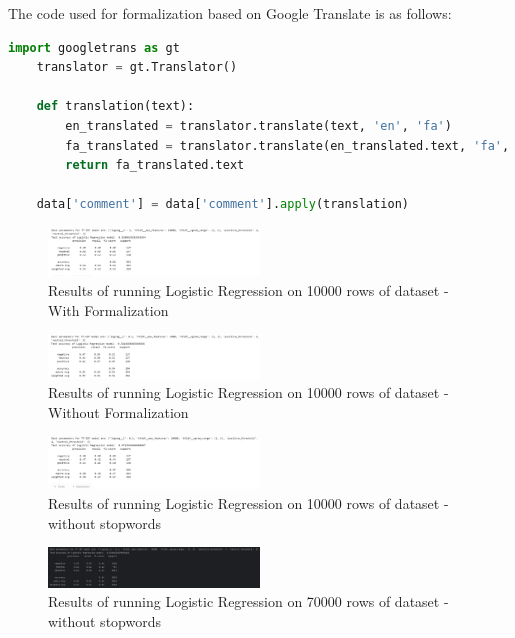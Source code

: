\documentclass{solutionclass} %
\begin{document}
The code used for formalization based on Google Translate is as follows:

\begin{lstlisting}[language=Python]
    import googletrans as gt
    translator = gt.Translator()
    
    def translation(text):
        en_translated = translator.translate(text, 'en', 'fa')
        fa_translated = translator.translate(en_translated.text, 'fa', 'en')
        return fa_translated.text
    
    data['comment'] = data['comment'].apply(translation)
\end{lstlisting}



\begin{figure}[h!]
    \caption{Results of running Logistic Regression on 10000 rows of dataset - With Formalization}
    \centering
    \includegraphics[width=0.5\textwidth]{img/10k_Form.png}
\end{figure}


\begin{figure}[h!]
    \caption{Results of running Logistic Regression on 10000 rows of dataset - Without Formalization}
    \centering
    \includegraphics[width=0.5\textwidth]{img/10k_NoForm.png}
\end{figure}



\begin{figure}[h!]
    \caption{Results of running Logistic Regression on 10000 rows of dataset - without stopwords}
    \centering
    \includegraphics[width=0.5\textwidth]{img/10k_NoSW.png}
\end{figure}


\begin{figure}[h!]
    \caption{Results of running Logistic Regression on 70000 rows of dataset - without stopwords}
    \centering
    \includegraphics[width=0.5\textwidth]{img/70k_NoSW.png}
\end{figure}
\end{document}

